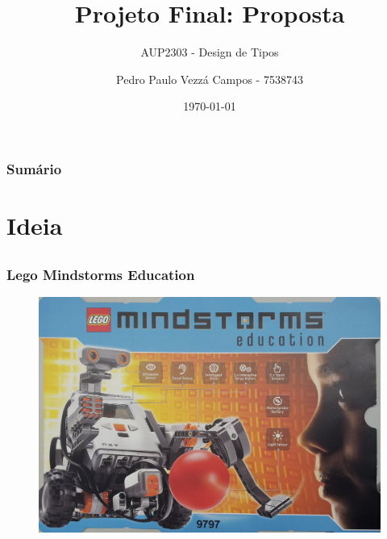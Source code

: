\documentclass{beamer}
\title{Projeto Final: Proposta}
\subtitle{AUP2303 - Design de Tipos}
\author{Pedro Paulo Vezzá Campos - 7538743}
\date{\today}
\begin{document}
\begin{frame}
\titlepage
\end{frame}

\begin{frame}
\frametitle{Sumário}
\tableofcontents
\end{frame}


\section{Ideia}
\subsection{}

\begin{frame}
\frametitle{Lego Mindstorms	Education}
\begin{figure}[htp]
\begin{center}
  \includegraphics[width=\linewidth]{imagens/pecas-003.jpg}
\end{center}
\end{figure}
\end{frame}
\end{document}
